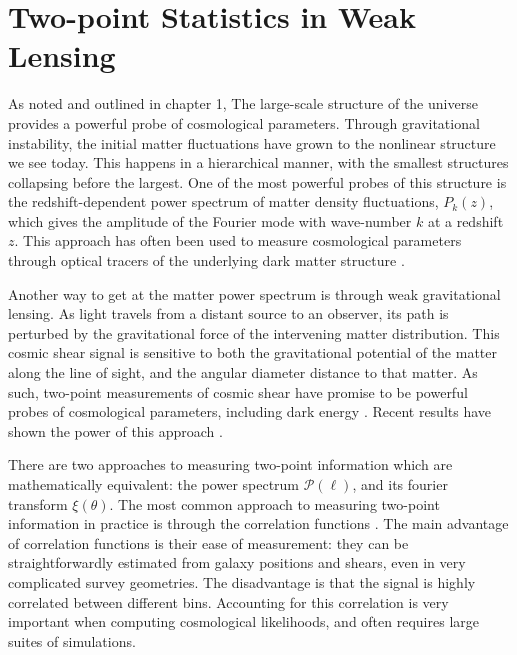\section{Two-point Statistics in Weak Lensing}
\label{sec:lensing_intro}
As noted and outlined in chapter 1,
The large-scale structure of the universe provides a powerful probe of
cosmological parameters.  Through gravitational instability, the initial
matter fluctuations have grown to the nonlinear structure we see today.
This happens in a hierarchical manner, with the smallest structures
collapsing before the largest.  One of the most powerful probes of this
structure is the redshift-dependent power spectrum of matter density
fluctuations, $P_k(z)$, which gives the amplitude of the
Fourier mode with wave-number $k$ at a redshift $z$. 
This approach has often been used to measure cosmological parameters
through optical tracers of the underlying dark matter structure
\citep[e.g.][]{Tegmark06}.

Another way to get at the matter power spectrum is through weak gravitational
lensing.  As light travels from a distant source to an observer, its path is
perturbed by the gravitational force of the intervening matter distribution.
This cosmic shear signal is sensitive to both the gravitational potential
of the matter along the line of sight, and the angular diameter distance
to that matter.  As such, two-point measurements of cosmic shear have promise
to be powerful probes of cosmological parameters, including dark energy
\citep[see][]{Takada07}.  Recent results have shown the power of this
approach \citep{Ichiki09, Schrabback10}.

There are two approaches to measuring two-point information which are 
mathematically equivalent: the power spectrum $\mathcal{P}(\ell)$,
and its fourier transform $\xi(\theta)$.
The most common approach to measuring two-point information in practice
is through the correlation functions \citep[see][]{Schneider02}.
The main advantage of correlation functions is their ease of measurement:
they can be straightforwardly estimated from galaxy positions and shears,
even in very complicated survey geometries.  The disadvantage is that the
signal is highly correlated between different bins.  Accounting for this 
correlation is very important when computing cosmological likelihoods,
and often requires large suites of simulations.

